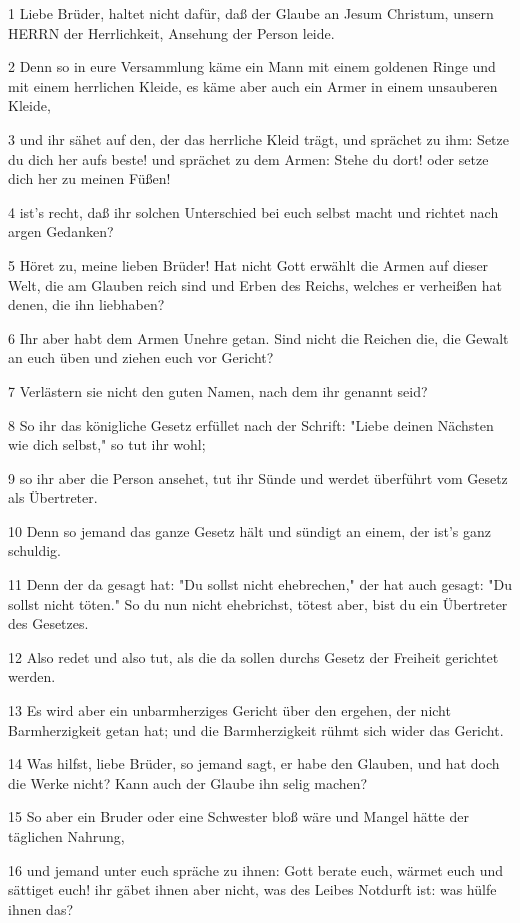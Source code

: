 \par 1 Liebe Brüder, haltet nicht dafür, daß der Glaube an Jesum Christum, unsern HERRN der Herrlichkeit, Ansehung der Person leide.
\par 2 Denn so in eure Versammlung käme ein Mann mit einem goldenen Ringe und mit einem herrlichen Kleide, es käme aber auch ein Armer in einem unsauberen Kleide,
\par 3 und ihr sähet auf den, der das herrliche Kleid trägt, und sprächet zu ihm: Setze du dich her aufs beste! und sprächet zu dem Armen: Stehe du dort! oder setze dich her zu meinen Füßen!
\par 4 ist's recht, daß ihr solchen Unterschied bei euch selbst macht und richtet nach argen Gedanken?
\par 5 Höret zu, meine lieben Brüder! Hat nicht Gott erwählt die Armen auf dieser Welt, die am Glauben reich sind und Erben des Reichs, welches er verheißen hat denen, die ihn liebhaben?
\par 6 Ihr aber habt dem Armen Unehre getan. Sind nicht die Reichen die, die Gewalt an euch üben und ziehen euch vor Gericht?
\par 7 Verlästern sie nicht den guten Namen, nach dem ihr genannt seid?
\par 8 So ihr das königliche Gesetz erfüllet nach der Schrift: "Liebe deinen Nächsten wie dich selbst," so tut ihr wohl;
\par 9 so ihr aber die Person ansehet, tut ihr Sünde und werdet überführt vom Gesetz als Übertreter.
\par 10 Denn so jemand das ganze Gesetz hält und sündigt an einem, der ist's ganz schuldig.
\par 11 Denn der da gesagt hat: "Du sollst nicht ehebrechen," der hat auch gesagt: "Du sollst nicht töten." So du nun nicht ehebrichst, tötest aber, bist du ein Übertreter des Gesetzes.
\par 12 Also redet und also tut, als die da sollen durchs Gesetz der Freiheit gerichtet werden.
\par 13 Es wird aber ein unbarmherziges Gericht über den ergehen, der nicht Barmherzigkeit getan hat; und die Barmherzigkeit rühmt sich wider das Gericht.
\par 14 Was hilfst, liebe Brüder, so jemand sagt, er habe den Glauben, und hat doch die Werke nicht? Kann auch der Glaube ihn selig machen?
\par 15 So aber ein Bruder oder eine Schwester bloß wäre und Mangel hätte der täglichen Nahrung,
\par 16 und jemand unter euch spräche zu ihnen: Gott berate euch, wärmet euch und sättiget euch! ihr gäbet ihnen aber nicht, was des Leibes Notdurft ist: was hülfe ihnen das?
